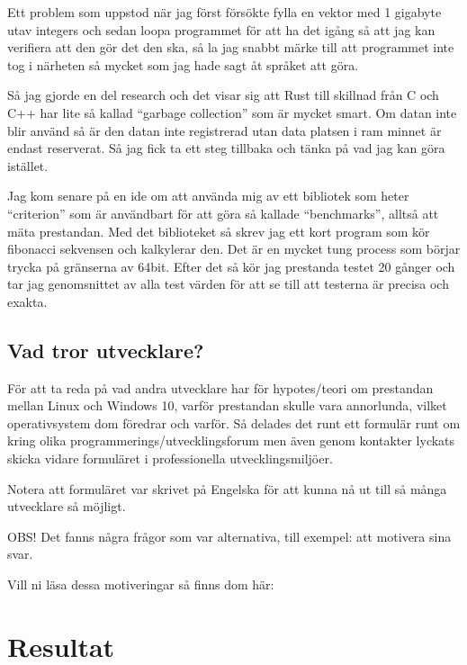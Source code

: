 \documentclass[12pt, a4paper]{report}
\begin{document}
Ett problem som uppstod när jag först försökte fylla en vektor med 1 gigabyte utav integers och sedan loopa programmet för att ha det igång så att jag kan verifiera att den gör det den ska, så la jag snabbt märke till att programmet inte tog i närheten så mycket som jag hade sagt åt språket att göra.

Så jag gjorde en del research och det visar sig att Rust till skillnad från C och C++ har lite så kallad ``garbage collection'' som är mycket smart. Om datan inte blir använd så är den datan inte registrerad utan data platsen i ram minnet är endast reserverat. Så jag fick ta ett steg tillbaka och tänka på vad jag kan göra istället.
 
Jag kom senare på en ide om att använda mig av ett bibliotek som heter ``criterion'' som är användbart för att göra så kallade ``benchmarks'', alltså att mäta prestandan. Med det biblioteket så skrev jag ett kort program som kör fibonacci sekvensen och kalkylerar den. Det är en mycket tung process som börjar trycka på gränserna av 64bit. Efter det så kör jag prestanda testet 20 gånger och tar jag genomsnittet av alla test värden för att se till att testerna är precisa och exakta.
 
 
\subsection{Vad tror utvecklare?}
 
   För att ta reda på vad andra utvecklare har för hypotes/teori om prestandan mellan Linux och Windows 10, varför prestandan skulle vara annorlunda, vilket operativsystem dom föredrar och varför. Så delades det runt ett formulär runt om kring olika programmerings/utvecklingsforum men även genom kontakter lyckats skicka vidare formuläret i professionella utvecklingsmiljöer.
 
   Notera att formuläret var skrivet på Engelska för att kunna nå ut till så många utvecklare så möjligt.
    
   \vspace{1cm}
 
 
   \small{OBS! Det fanns några frågor som var alternativa, till exempel: att motivera sina svar.
  
   Vill ni läsa dessa motiveringar så finns dom här:} 
 
\vspace{1cm}
\section{Resultat}
\end{document}
